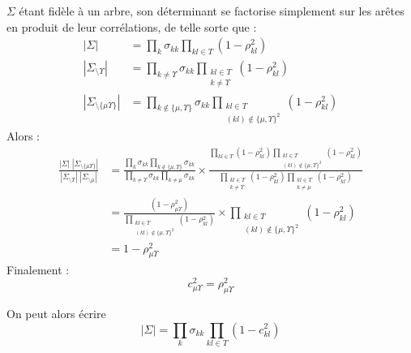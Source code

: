\documentclass[11pt,a4paper]{article}
\begin{document}
$\Sigma$ étant fidèle à un arbre, son déterminant se factorise simplement sur les arêtes en produit de leur corrélations, de telle sorte que :
\begin{align*}
    |\Sigma| &= \prod_k \sigma_{kk} \prod_{kl\in T} (1-\rho_{kl}^2)\\
    |\Sigma_{\setminus\Upsilon}| &= \prod_{k \neq \Upsilon} \sigma_{kk} \prod_{\substack{kl\in T \\ k \neq \Upsilon}} (1-\rho_{kl}^2)\\
    |\Sigma_{\setminus \{\mu\Upsilon\}}| &= \prod_{k\notin \{\mu, \Upsilon\}} \sigma_{kk} \prod_{\substack{kl\in T\\ (kl) \notin \{\mu, \Upsilon\}^2 }} (1-\rho_{kl}^2)
\end{align*}
Alors :
\begin{align*}
    \frac{|\Sigma|\;|\Sigma_{\setminus \{\mu\Upsilon\}}|}{|\Sigma_{\setminus\Upsilon}|\;|\Sigma_{\setminus \mu}|} &=\frac{\prod_k \sigma_{kk} \prod_{k\notin \{\mu, \Upsilon\}} \sigma_{kk}}{\prod_{k \neq \Upsilon} \sigma_{kk} \prod_{k \neq \mu} \sigma_{kk}} \times \frac{ \prod_{kl\in T} (1-\rho_{kl}^2)\prod_{\substack{kl\in T\\ (kl) \notin \{\mu, \Upsilon\}^2 }} (1-\rho_{kl}^2)}{\prod_{\substack{kl\in T \\ k \neq \Upsilon}} (1-\rho_{kl}^2)\prod_{\substack{kl\in T \\ k \neq \mu}} (1-\rho_{kl}^2)} \\
    &=\frac{(1-\rho_{\mu\Upsilon}^2)}{\prod_{\substack{kl\in T\\ (kl) \notin \{\mu, \Upsilon\}^2 }} (1-\rho_{kl}^2)} \times \prod_{\substack{kl\in T\\ (kl) \notin \{\mu, \Upsilon\}^2 }} (1-\rho_{kl}^2)\\
     &=1-\rho_{\mu\Upsilon}^2
\end{align*}
Finalement : 
$$\boxed{c_{\mu\Upsilon}^2 = \rho_{\mu\Upsilon}^2}$$

On peut alors écrire
$$ |\Sigma| = \prod_k \sigma_{kk} \prod_{kl \in T} (1-c_{kl}^2)$$
\end{document}
